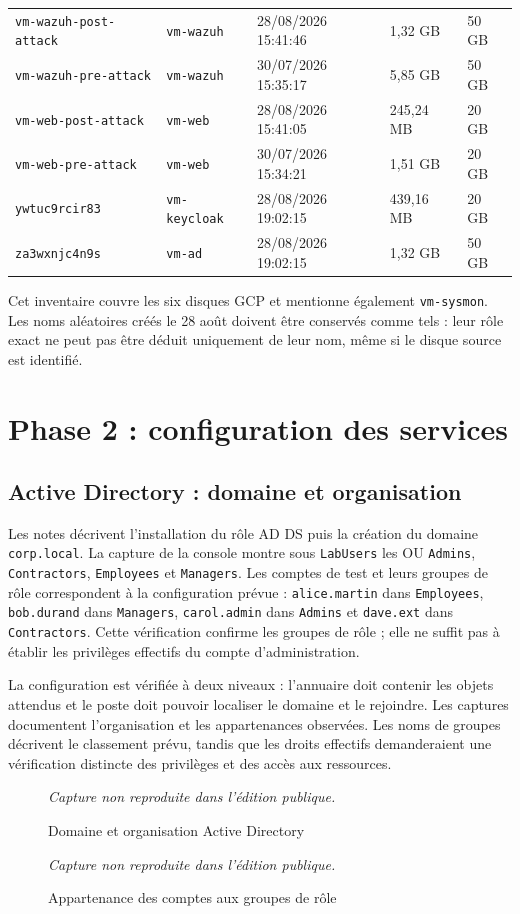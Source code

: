 \documentclass[a4paper,12pt]{report}
\newcommand{\publiccapture}[1]{%
  \begin{figure}[H]\centering
  {\footnotesize\itshape Capture non reproduite dans l'édition publique.}
  \caption{#1}\end{figure}}
\begin{document}
\begin{longtable}{@{}p{4.4cm}p{2.4cm}p{3.4cm}p{1.8cm}p{1.5cm}@{}}
\texttt{vm-wazuh-post-attack} & \texttt{vm-wazuh} & 28/08/2026 15:41:46 & 1,32 GB & 50 GB \\
\texttt{vm-wazuh-pre-attack} & \texttt{vm-wazuh} & 30/07/2026 15:35:17 & 5,85 GB & 50 GB \\
\texttt{vm-web-post-attack} & \texttt{vm-web} & 28/08/2026 15:41:05 & 245,24 MB & 20 GB \\
\texttt{vm-web-pre-attack} & \texttt{vm-web} & 30/07/2026 15:34:21 & 1,51 GB & 20 GB \\
\texttt{ywtuc9rcir83} & \texttt{vm-keycloak} & 28/08/2026 19:02:15 & 439,16 MB & 20 GB \\
\texttt{za3wxnjc4n9s} & \texttt{vm-ad} & 28/08/2026 19:02:15 & 1,32 GB & 50 GB \\
\end{longtable}

Cet inventaire couvre les six disques GCP et mentionne également \texttt{vm-sysmon}. Les noms aléatoires créés le 28 août doivent être conservés comme tels : leur rôle exact ne peut pas être déduit uniquement de leur nom, même si le disque source est identifié.

\section{Phase 2 : configuration des services}
\subsection{Active Directory : domaine et organisation}
Les notes décrivent l'installation du rôle AD DS puis la création du domaine \texttt{corp.local}. La capture de la console montre sous \texttt{LabUsers} les OU \texttt{Admins}, \texttt{Contractors}, \texttt{Employees} et \texttt{Managers}. Les comptes de test et leurs groupes de rôle correspondent à la configuration prévue : \texttt{alice.martin} dans \texttt{Employees}, \texttt{bob.durand} dans \texttt{Managers}, \texttt{carol.admin} dans \texttt{Admins} et \texttt{dave.ext} dans \texttt{Contractors}. Cette vérification confirme les groupes de rôle ; elle ne suffit pas à établir les privilèges effectifs du compte d'administration.

La configuration est vérifiée à deux niveaux : l'annuaire doit contenir les objets attendus et le poste doit pouvoir localiser le domaine et le rejoindre. Les captures documentent l'organisation et les appartenances observées. Les noms de groupes décrivent le classement prévu, tandis que les droits effectifs demanderaient une vérification distincte des privilèges et des accès aux ressources.
\publiccapture{Domaine et organisation Active Directory}
\publiccapture{Appartenance des comptes aux groupes de rôle}
\end{document}
